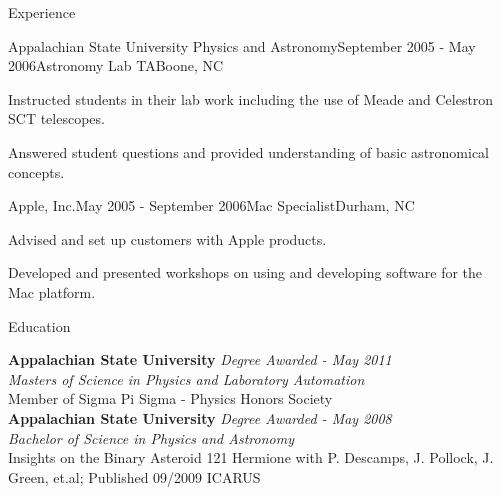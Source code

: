\documentclass{cv} %
\begin{document}
\begin{rSection}{Experience}
\begin{rSubsection}{Appalachian State University Physics and Astronomy}{September 2005 - May 2006}{Astronomy Lab TA}{Boone, NC}
\item Instructed students in their lab work including the use of Meade and Celestron SCT telescopes.
\item Answered student questions and provided understanding of basic astronomical concepts.
\end{rSubsection}

\begin{rSubsection}{Apple, Inc.}{May 2005 - September 2006}{Mac Specialist}{Durham, NC}
\item Advised and set up customers with Apple products.
\item Developed and presented workshops on using and developing software for the Mac platform.
\end{rSubsection}

\end{rSection}


\begin{rSection}{Education}
	
	{\bf Appalachian State University} \hfill {\em Degree Awarded - May 2011} \\ 
	{\em Masters of Science in Physics and Laboratory Automation} \\
	Member of Sigma Pi Sigma - Physics Honors Society \\
	
	{\bf Appalachian State University} \hfill {\em Degree Awarded - May 2008} \\ 
	{\em Bachelor of Science in Physics and Astronomy} \\
	{Insights on the Binary Asteroid 121 Hermione with P. Descamps, J. Pollock, J. Green, et.al; \linebreak Published 09/2009 ICARUS}
	
	
\end{rSection}

\end{document}
